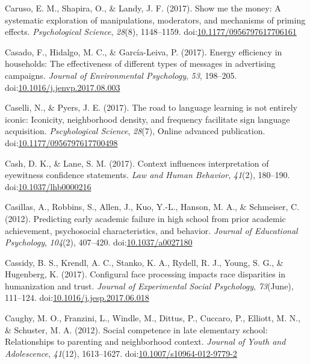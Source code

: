 \documentclass[english,man]{apa6}
\begin{document}
\hypertarget{ref-Caruso2017}{}
Caruso, E. M., Shapira, O., \& Landy, J. F. (2017). Show me the money: A
systematic exploration of manipulations, moderators, and mechanisms of
priming effects. \emph{Psychological Science}, \emph{28}(8), 1148--1159.
doi:\href{https://doi.org/10.1177/0956797617706161}{10.1177/0956797617706161}

\hypertarget{ref-Casado2017}{}
Casado, F., Hidalgo, M. C., \& García-Leiva, P. (2017). Energy
efficiency in households: The effectiveness of different types of
messages in advertising campaigns. \emph{Journal of Environmental
Psychology}, \emph{53}, 198--205.
doi:\href{https://doi.org/10.1016/j.jenvp.2017.08.003}{10.1016/j.jenvp.2017.08.003}

\hypertarget{ref-Caselli2017}{}
Caselli, N., \& Pyers, J. E. (2017). The road to language learning is
not entirely iconic: Iconicity, neighborhood density, and frequency
facilitate sign language acquisition. \emph{Pscyhological Science},
\emph{28}(7), Online advanced publication.
doi:\href{https://doi.org/10.1177/0956797617700498}{10.1177/0956797617700498}

\hypertarget{ref-Cash2017}{}
Cash, D. K., \& Lane, S. M. (2017). Context influences interpretation of
eyewitness confidence statements. \emph{Law and Human Behavior},
\emph{41}(2), 180--190.
doi:\href{https://doi.org/10.1037/lhb0000216}{10.1037/lhb0000216}

\hypertarget{ref-Casillas2012}{}
Casillas, A., Robbins, S., Allen, J., Kuo, Y.-L., Hanson, M. A., \&
Schmeiser, C. (2012). Predicting early academic failure in high school
from prior academic achievement, psychosocial characteristics, and
behavior. \emph{Journal of Educational Psychology}, \emph{104}(2),
407--420. doi:\href{https://doi.org/10.1037/a0027180}{10.1037/a0027180}

\hypertarget{ref-Cassidy2017}{}
Cassidy, B. S., Krendl, A. C., Stanko, K. A., Rydell, R. J., Young, S.
G., \& Hugenberg, K. (2017). Configural face processing impacts race
disparities in humanization and trust. \emph{Journal of Experimental
Social Psychology}, \emph{73}(June), 111--124.
doi:\href{https://doi.org/10.1016/j.jesp.2017.06.018}{10.1016/j.jesp.2017.06.018}

\hypertarget{ref-Caughy2012}{}
Caughy, M. O., Franzini, L., Windle, M., Dittus, P., Cuccaro, P.,
Elliott, M. N., \& Schuster, M. A. (2012). Social competence in late
elementary school: Relationships to parenting and neighborhood context.
\emph{Journal of Youth and Adolescence}, \emph{41}(12), 1613--1627.
doi:\href{https://doi.org/10.1007/s10964-012-9779-2}{10.1007/s10964-012-9779-2}
\end{document}
